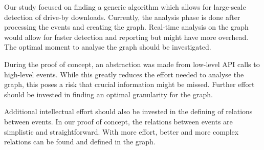 Our study focused on finding a generic algorithm which allows for large-scale detection of drive-by downloads. Currently, the analysis phase is done after processing the events and creating the graph. Real-time analysis on the graph would allow for faster detection and reporting but might have more overhead. The optimal moment to analyse the graph should be investigated.

During the proof of concept, an abstraction was made from low-level API calls to high-level events. While this greatly reduces the effort needed to analyse the graph, this poses a risk that crucial information might be missed. Further effort should be invested in finding an optimal granularity for the graph.

Additional intellectual effort should also be invested in the defining of relations between events. In our proof of concept, the relations between events are simplistic and straightforward. With more effort, better and more complex relations can be found and defined in the graph.

